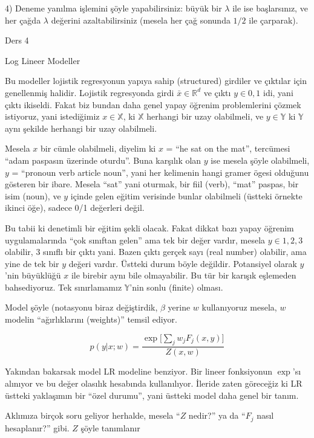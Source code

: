 \documentclass[12pt,fleqn]{article}\usepackage{../../common}
\begin{document}
4) Deneme yanılma işlemini şöyle yapabilirsiniz: büyük bir $\lambda$ ile
ise başlarsınız, ve her çağda $\lambda$ değerini azaltabilirsiniz (mesela
her çağ sonunda $1/2$ ile çarparak).

Ders 4

Log Lineer Modeller

Bu modeller lojistik regresyonun yapıya sahip (structured) girdiler ve
çıktılar için genellenmiş halidir. Lojistik regresyonda girdi $\bar{x} \in
\mathbb{R}^d$ ve çıktı $y \in {0,1}$ idi, yani çıktı ikiseldi. Fakat biz bundan 
daha genel yapay öğrenim problemlerini çözmek istiyoruz, yani 
istediğimiz $x \in \mathbb{X}$, ki $\mathbb{X}$ herhangi bir 
uzay olabilmeli, ve $y \in \mathbb{Y}$ ki $\mathbb{Y}$ aynı şekilde
herhangi  bir uzay olabilmeli. 

Mesela $x$ bir cümle olabilmeli, diyelim ki $x$ = ``he sat on the mat'',
tercümesi ``adam paspasın üzerinde oturdu''. Buna karşılık olan $y$ ise
mesela şöyle olabilmeli, $y$ = ``pronoun verb article noun'', yani her
kelimenin hangi gramer ögesi olduğunu gösteren bir ibare. Mesela ``sat''
yani oturmak, bir fiil (verb), ``mat'' paspas, bir isim (noun), ve $y$
içinde gelen eğitim verisinde bunlar olabilmeli (üstteki örnekte ikinci
öğe), sadece 0/1 değerleri değil.

Bu tabii ki denetimli bir eğitim şekli olacak. Fakat dikkat bazı yapay
öğrenim uygulamalarında ``çok sınıftan gelen'' ama tek bir değer vardır,
mesela $y \in {1,2,3}$ olabilir, 3 sınıflı bir çıktı yani. Bazen çıktı
gerçek sayı (real number) olabilir, ama yine de tek bir $y$ değeri
vardır. Üstteki durum böyle değildir. Potansiyel olarak $y$'nin büyüklüğü
$x$ ile birebir aynı bile olmayabilir. Bu tür bir karışık eşlemeden
bahsediyoruz.  Tek sınırlamamız $\mathbb{Y}$'nin sonlu (finite) olması.

Model şöyle (notasyonu biraz değiştirdik, $\beta$ yerine $w$ kullanıyoruz
mesela, $w$ modelin ``ağırlıklarını (weights)'' temsil ediyor.

$$
p(y|x;w) = 
\frac{\exp \big[ \sum_{j} w_j F_j (x,y) \big]}{Z(x,w)}
$$

Yakından bakarsak model LR modeline benziyor. Bir lineer fonksiyonun
$\exp$'sı alınıyor ve bu değer olasılık hesabında kullanılıyor. İleride
zaten göreceğiz ki LR üstteki yaklaşımın bir ``özel durumu'', yani üstteki
model daha genel bir tanım. 

Aklımıza birçok soru geliyor herhalde, mesela ``$Z$ nedir?'' ya da ``$F_j$
nasıl hesaplanır?'' gibi. $Z$ şöyle tanımlanır
\end{document}
